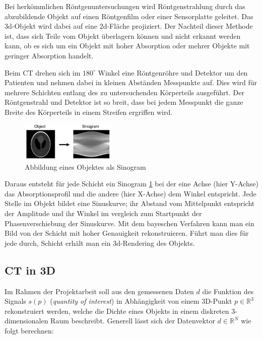 Bei herkömmlichen Röntgenuntersuchungen wird Röntgenstrahlung durch das abzubildende Objekt auf einen Röntgenfilm oder einer Sensorplatte geleitet. Das 3d-Objekt wird dabei auf eine 2d-Fläche projiziert. Der Nachteil dieser Methode ist, dass sich Teile vom Objekt überlagern können und nicht erkannt werden kann, ob es sich um ein Objekt mit hoher Absorption oder mehrer Objekte mit geringer Absorption handelt.

Beim CT drehen sich im $180^\circ$ Winkel eine Röntgenröhre und Detektor um den Patienten und nehmen dabei in kleinen Abständen Messpunkte auf. Dies wird für mehrere Schichten entlang des zu untersuchenden Körperteils ausgeführt. Der Röntgenstrahl und Detektor ist so breit, dass bei jedem Messpunkt die ganze Breite des Körperteils in einem Streifen ergriffen wird.

\begin{figure}
 \includegraphics[width=0.4\textwidth]{k4.2/backprojektion.png}
 \caption{Abbildung eines Objektes als Sinogram}
 \label{k4.2.tomo.ct.bp}
\end{figure}

Daraus entsteht für jede Schicht ein Sinogram \cref{k4.2.tomo.ct.bp} bei der eine Achse (hier Y-Achse) das Absorptionsprofil und die andere (hier X-Achse) dem Winkel entspricht. Jede Stelle im Objekt bildet eine Sinuskurve; ihr Abstand vom Mittelpunkt entspricht der Amplitude und ihr Winkel im vergleich zum Startpunkt der Phasenverschiebung der Sinuskurve. Mit dem bayeschen Verfahren  kann man ein Bild von der Schicht mit hoher Genauigkeit rekonstruieren. Führt man dies für jede durch, Schicht erhält man ein 3d-Rendering des Objekts.


\subsection{CT in 3D}

Im Rahmen der Projektarbeit soll aus den gemessenen Daten $d$ die Funktion des Signals $s(p)$ (\emph{quantity of interest}) in Abhängigkeit von einem 3D-Punkt $p \in \mathbb{R}^3$ rekonstruiert werden, welche die Dichte eines Objekts in einem diskreten 3-dimensionalen Raum beschreibt. Generell lässt sich der Datenvektor $d \in \mathbb{R}^N$ wie folgt berechnen:

